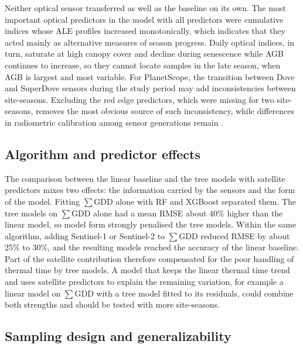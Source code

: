 \documentclass[
  british,
]{interact}
\begin{document}
Neither optical sensor transferred as well as the baseline on its own.
The most important optical predictors in the model with all predictors
were cumulative indices whose ALE profiles increased monotonically,
which indicates that they acted mainly as alternative measures of season
progress. Daily optical indices, in turn, saturate at high canopy cover
and decline during senescence while AGB continues to increase, so they
cannot locate samples in the late season, when AGB is largest and most
variable. For PlanetScope, the transition between Dove and SuperDove
sensors during the study period may add inconsistencies between
site-seasons. Excluding the red edge predictors, which were missing for
two site-seasons, removes the most obvious source of such inconsistency,
while differences in radiometric calibration among sensor generations
remain \citep{Roy2021}.

\subsection{Algorithm and predictor
effects}\label{algorithm-and-predictor-effects}

The comparison between the linear baseline and the tree models with
satellite predictors mixes two effects: the information carried by the
sensors and the form of the model. Fitting \(\sum\)GDD alone with RF and
XGBoost separated them. The tree models on \(\sum\)GDD alone had a mean
RMSE about 40\% higher than the linear model, so model form strongly
penalised the tree models. Within the same algorithm, adding Sentinel-1
or Sentinel-2 to \(\sum\)GDD reduced RMSE by about 25\% to 30\%, and the
resulting models reached the accuracy of the linear baseline. Part of
the satellite contribution therefore compensated for the poor handling
of thermal time by tree models. A model that keeps the linear thermal
time trend and uses satellite predictors to explain the remaining
variation, for example a linear model on \(\sum\)GDD with a tree model
fitted to its residuals, could combine both strengths and should be
tested with more site-seasons.

\subsection{Sampling design and
generalizability}\label{sampling-design-and-generalizability}
\end{document}
